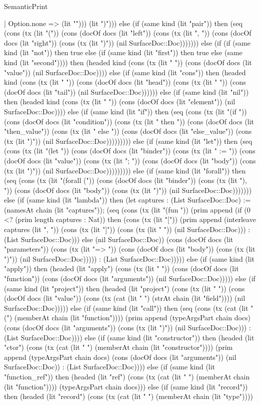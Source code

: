 \begin{lexlean}{SemanticPrint}
\begin{semanticmodule}
{      | Option.none => (lit ""))) (lit ")"))) else (if (same kind (lit "pair")) then (seq (cons (tx (lit "(")) (cons (docOf docs (lit "left")) (cons (tx (lit ", ")) (cons (docOf docs (lit "right")) (cons (tx (lit ")")) (nil SurfaceDoc::Doc))))))) else (if (if (same kind (lit "not")) then true else (if (same kind (lit "first")) then true else (same kind (lit "second")))) then (headed kind (cons (tx (lit " ")) (cons (docOf docs (lit "value")) (nil SurfaceDoc::Doc)))) else (if (same kind (lit "cons")) then (headed kind (cons (tx (lit " ")) (cons (docOf docs (lit "head")) (cons (tx (lit " ")) (cons (docOf docs (lit "tail")) (nil SurfaceDoc::Doc)))))) else (if (same kind (lit "nil")) then (headed kind (cons (tx (lit " ")) (cons (docOf docs (lit "element")) (nil SurfaceDoc::Doc)))) else (if (same kind (lit "if")) then (seq (cons (tx (lit "(if ")) (cons (docOf docs (lit "condition")) (cons (tx (lit " then ")) (cons (docOf docs (lit "then_value")) (cons (tx (lit " else ")) (cons (docOf docs (lit "else_value")) (cons (tx (lit ")")) (nil SurfaceDoc::Doc))))))))) else (if (same kind (lit "let")) then (seq (cons (tx (lit "(let ")) (cons (docOf docs (lit "binder")) (cons (tx (lit " := ")) (cons (docOf docs (lit "value")) (cons (tx (lit "; ")) (cons (docOf docs (lit "body")) (cons (tx (lit ")")) (nil SurfaceDoc::Doc))))))))) else (if (same kind (lit "forall")) then (seq (cons (tx (lit "(forall (")) (cons (docOf docs (lit "binder")) (cons (tx (lit "), ")) (cons (docOf docs (lit "body")) (cons (tx (lit ")")) (nil SurfaceDoc::Doc))))))) else (if (same kind (lit "lambda")) then (let captures : (List SurfaceDoc::Doc) := (namesAt chain (lit "captures")); (seq (cons (tx (lit "(fun ")) (prim append (if (0 <? (prim length captures : Nat)) then (cons (tx (lit "[")) (prim append (interleave captures (lit ", ")) (cons (tx (lit "]")) (cons (tx (lit " ")) (nil SurfaceDoc::Doc))) : (List SurfaceDoc::Doc))) else (nil SurfaceDoc::Doc)) (cons (docOf docs (lit "parameters")) (cons (tx (lit "=> ")) (cons (docOf docs (lit "body")) (cons (tx (lit ")")) (nil SurfaceDoc::Doc))))) : (List SurfaceDoc::Doc))))) else (if (same kind (lit "apply")) then (headed (lit "apply") (cons (tx (lit " ")) (cons (docOf docs (lit "function")) (cons (docOf docs (lit "arguments")) (nil SurfaceDoc::Doc))))) else (if (same kind (lit "project")) then (headed (lit "project") (cons (tx (lit " ")) (cons (docOf docs (lit "value")) (cons (tx (cat (lit " ") (strAt chain (lit "field")))) (nil SurfaceDoc::Doc))))) else (if (same kind (lit "call")) then (seq (cons (tx (cat (lit "(") (memberAt chain (lit "function")))) (prim append (typeArgsPart chain docs) (cons (docOf docs (lit "arguments")) (cons (tx (lit ")")) (nil SurfaceDoc::Doc))) : (List SurfaceDoc::Doc)))) else (if (same kind (lit "constructor")) then (headed (lit "ctor") (cons (tx (cat (lit " ") (memberAt chain (lit "constructor")))) (prim append (typeArgsPart chain docs) (cons (docOf docs (lit "arguments")) (nil SurfaceDoc::Doc)) : (List SurfaceDoc::Doc)))) else (if (same kind (lit "function_ref")) then (headed (lit "ref") (cons (tx (cat (lit " ") (memberAt chain (lit "function")))) (typeArgsPart chain docs))) else (if (same kind (lit "record")) then (headed (lit "record") (cons (tx (cat (lit " ") (memberAt chain (lit "type")))) }
\end{semanticmodule}
\end{lexlean}
